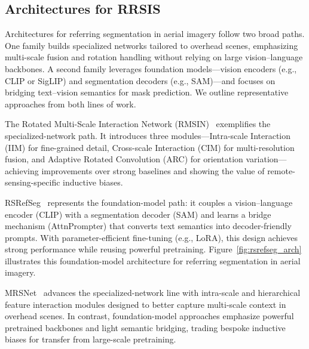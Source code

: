 \subsection{Architectures for RRSIS}

Architectures for referring segmentation in aerial imagery follow two broad paths. One family builds specialized networks tailored to overhead scenes, emphasizing multi-scale fusion and rotation handling without relying on large vision–language backbones. A second family leverages foundation models—vision encoders (e.g., CLIP or SigLIP) and segmentation decoders (e.g., SAM)—and focuses on bridging text–vision semantics for mask prediction. We outline representative approaches from both lines of work.

The Rotated Multi-Scale Interaction Network (RMSIN)~\cite{liu2024rotated} exemplifies the specialized-network path. It introduces three modules—Intra-scale Interaction (IIM) for fine-grained detail, Cross-scale Interaction (CIM) for multi-resolution fusion, and Adaptive Rotated Convolution (ARC) for orientation variation—achieving improvements over strong baselines and showing the value of remote-sensing-specific inductive biases.

RSRefSeg~\cite{chen2025rsrefseg} represents the foundation-model path: it couples a vision–language encoder (CLIP) with a segmentation decoder (SAM) and learns a bridge mechanism (AttnPrompter) that converts text semantics into decoder-friendly prompts. With parameter-efficient fine-tuning (e.g., LoRA), this design achieves strong performance while reusing powerful pretraining. Figure~\ref{fig:rsrefseg_arch} illustrates this foundation-model architecture for referring segmentation in aerial imagery.

MRSNet~\cite{yang2024large} advances the specialized-network line with intra-scale and hierarchical feature interaction modules designed to better capture multi-scale context in overhead scenes. In contrast, foundation-model approaches emphasize powerful pretrained backbones and light semantic bridging, trading bespoke inductive biases for transfer from large-scale pretraining.

